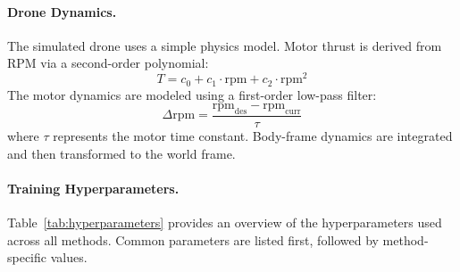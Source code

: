 \paragraph{Drone Dynamics.}
The simulated drone uses a simple physics model. Motor thrust is derived from RPM via a second-order polynomial:
\[
T = c_0 + c_1 \cdot \text{rpm} + c_2 \cdot \text{rpm}^2
\]
The motor dynamics are modeled using a first-order low-pass filter:
\[
\Delta \text{rpm} = \frac{\text{rpm}_{\text{des}} - \text{rpm}_{\text{curr}}}{\tau}
\]
where \( \tau \) represents the motor time constant. Body-frame dynamics are integrated and then transformed to the world frame.

\paragraph{Training Hyperparameters.}
Table~\ref{tab:hyperparameters} provides an overview of the hyperparameters used across all methods. Common parameters are listed first, followed by method-specific values.


